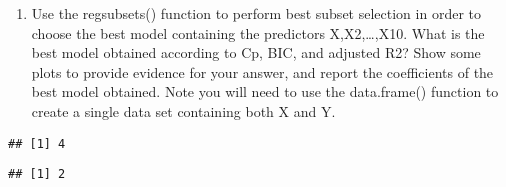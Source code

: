 \documentclass[
]{article}
\newenvironment{Shaded}{\begin{snugshade}}{\end{snugshade}}
\newcommand{\AttributeTok}[1]{\textcolor[rgb]{0.77,0.63,0.00}{#1}}
\newcommand{\ConstantTok}[1]{\textcolor[rgb]{0.00,0.00,0.00}{#1}}
\newcommand{\DecValTok}[1]{\textcolor[rgb]{0.00,0.00,0.81}{#1}}
\newcommand{\FunctionTok}[1]{\textcolor[rgb]{0.00,0.00,0.00}{#1}}
\newcommand{\NormalTok}[1]{#1}
\newcommand{\OtherTok}[1]{\textcolor[rgb]{0.56,0.35,0.01}{#1}}
\newcommand{\SpecialCharTok}[1]{\textcolor[rgb]{0.00,0.00,0.00}{#1}}
\newcommand{\StringTok}[1]{\textcolor[rgb]{0.31,0.60,0.02}{#1}}
\providecommand{\tightlist}{%
  \setlength{\itemsep}{0pt}\setlength{\parskip}{0pt}}
\begin{document}
\begin{enumerate}
\def\labelenumi{(\alph{enumi})}
\setcounter{enumi}{2}
\tightlist
\item
  Use the regsubsets() function to perform best subset selection in
  order to choose the best model containing the predictors
  X,X2,\ldots,X10. What is the best model obtained according to Cp, BIC,
  and adjusted R2? Show some plots to provide evidence for your answer,
  and report the coefficients of the best model obtained. Note you will
  need to use the data.frame() function to create a single data set
  containing both X and Y.
\end{enumerate}

\begin{Shaded}
\end{Shaded}

\begin{verbatim}
## [1] 4
\end{verbatim}

\begin{Shaded}
\end{Shaded}

\begin{verbatim}
## [1] 2
\end{verbatim}

\begin{Shaded}
\end{Shaded}
\end{document}
